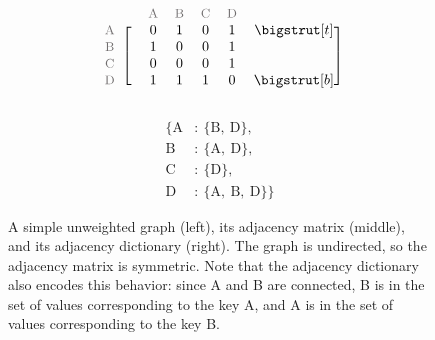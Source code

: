\begin{figure}[H] %
\captionsetup[subfigure]{justification=centering}
\centering
\begin{subfigure}{.32\textwidth}
\centering
{}
\end{subfigure}
%
\begin{subfigure}{.32\textwidth}
\centering
\begin{align*}
    \begin{blockarray}{ccccccc}
    & & \small\text{\textcolor{gray}{A}} & \small\text{\textcolor{gray}{B}} & \small\text{\textcolor{gray}{C}} & \small\text{\textcolor{gray}{D}} & \\
    \begin{block}{c[cccccc]}
    \small\text{\textcolor{gray}{A}} & & 0 & 1 & 0 & 1 & \topstrut\\
    \small\text{\textcolor{gray}{B}} & & 1 & 0 & 0 & 1 & \\
    \small\text{\textcolor{gray}{C}} & & 0 & 0 & 0 & 1 & \\
    \small\text{\textcolor{gray}{D}} & & 1 & 1 & 1 & 0 & \botstrut\\
    \end{block}\end{blockarray}
\end{align*}
\end{subfigure}
%
\begin{subfigure}{.32\textwidth}
\centering
\begin{align*}
\{\text{A}&:\ \{\text{B},\ \text{D}\},\\
  \text{B}&:\ \{\text{A},\ \text{D}\},\\
  \text{C}&:\ \{\text{D}\},\\
  \text{D}&:\ \{\text{A},\ \text{B},\ \text{D}\}\}
\end{align*}
\end{subfigure}
\caption{A simple unweighted graph (left), its adjacency matrix (middle), and its adjacency dictionary (right).
The graph is undirected, so the adjacency matrix is symmetric.
Note that the adjacency dictionary also encodes this behavior: since A and B are connected, B is in the set of values corresponding to the key A, and A is in the set of values corresponding to the key B.}
\label{fig:bfs-simple-graph_graph}
\end{figure}

